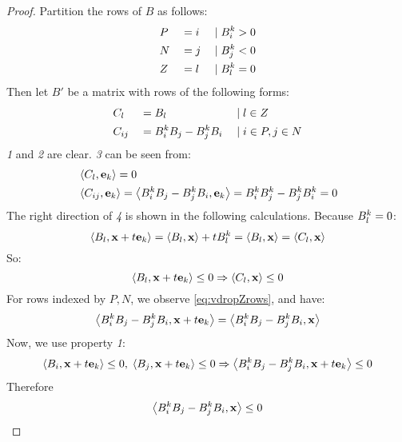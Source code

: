 \begin{proof}
	Partition the rows of $B$ as follows:
	\begin{alignat*}{3}
		 & P &  & = i & \;|\; & B^k_i > 0 \\
		 & N &  & = j & \;|\; & B^k_j < 0 \\
		 & Z &  & = l & \;|\; & B^k_l = 0
	\end{alignat*}
	Then let $B'$ be a matrix with rows of the following forms:
	\begin{alignat*}{3}
		 & C_l    &  & = B_l                 & \;|\; & l \in Z          \\
		 & C_{ij} &  & = B^k_i B_j - B^k_j B_i & \;|\; & i \in P, j \in N
	\end{alignat*}
	\textit{1} and \textit{2} are clear.  \textit{3} can be seen from:
	\begin{align}
		 & \left\langle C_l, \mathbf{e}_k \right\rangle = 0 \nonumber                                                                        \\
		 & \left\langle C_{ij}, \mathbf{e}_k \right\rangle = \left\langle B^k_i B_j - B^k_j B_i, \mathbf{e}_k \right\rangle = B^k_i B^k_j - B^k_j B^k_i = 0\label{eq:vdropZrows}
	\end{align}
	The right direction of \textit{4} is shown in the following calculations.  Because $B^k_l = 0$:
	\[ \left\langle B_l, \mathbf{x}+t\mathbf{e}_k \right\rangle = \left\langle B_l, \mathbf{x} \right\rangle + tB^k_l = \left\langle B_l, \mathbf{x} \right\rangle = \left\langle C_l, \mathbf{x} \right\rangle \]
	So:
	\[ \left\langle B_l, \mathbf{x}+t\mathbf{e}_k \right\rangle \leq 0 \Rightarrow \left\langle C_l, \mathbf{x} \right\rangle \leq 0 \]
	For rows indexed by $P,N$, we observe \eqref{eq:vdropZrows}, and have:
	\[ \left\langle B^k_i B_j - B^k_j B_i, \mathbf{x} + t\mathbf{e}_k \right\rangle = \left\langle B^k_i B_j - B^k_j B_i, \mathbf{x} \right\rangle \]
	Now, we use property \textit{1}:
	\[ \left\langle B_i, \mathbf{x}+t\mathbf{e}_k \right\rangle \leq 0,\; \left\langle B_j, \mathbf{x}+t\mathbf{e}_k \right\rangle \leq 0 \Rightarrow
		\left\langle B^k_i B_j - B^k_j B_i, \mathbf{x} + t\mathbf{e}_k \right\rangle \leq 0\]
	Therefore
	\[ \left\langle B^k_i B_j - B^k_j B_i, \mathbf{x} \right\rangle \leq 0 \]


\end{proof}
